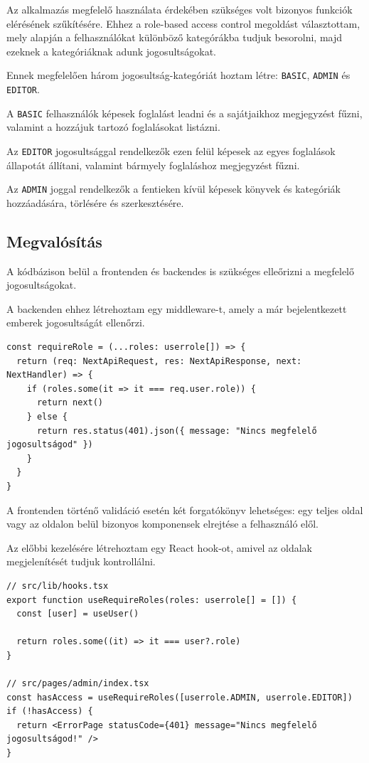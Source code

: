 Az alkalmazás megfelelő használata érdekében szükséges volt bizonyos funkciók elérésének szűkítésére. Ehhez a role-based access control
megoldást választottam, mely alapján a felhasználókat különböző kategórákba tudjuk besorolni, majd ezeknek a kategóriáknak adunk jogosultságokat.

Ennek megfelelően három jogosultság-kategóriát hoztam létre: \lstinline|BASIC|, \lstinline|ADMIN| és \lstinline|EDITOR|.

A \lstinline|BASIC| felhasználók képesek foglalást leadni és a sajátjaikhoz megjegyzést fűzni, valamint a hozzájuk tartozó foglalásokat listázni.

Az \lstinline|EDITOR| jogosultsággal rendelkezők ezen felül képesek az egyes foglalások állapotát állítani, valamint bármyely foglaláshoz
megjegyzést fűzni.

Az \lstinline|ADMIN| joggal rendelkezők a fentieken kívül képesek könyvek és kategóriák hozzáadására, törlésére és szerkesztésére.

\subsection{Megvalósítás}

A kódbázison belül a frontenden és backendes is szükséges elleőrizni a megfelelő jogosultságokat.

A backenden ehhez létrehoztam egy middleware-t, amely a már bejelentkezett emberek jogosultságát ellenőrzi.
\begin{lstlisting}[caption=Authorizáció middleware]
const requireRole = (...roles: userrole[]) => {
  return (req: NextApiRequest, res: NextApiResponse, next: NextHandler) => {
    if (roles.some(it => it === req.user.role)) {
      return next()
    } else {
      return res.status(401).json({ message: "Nincs megfelelő jogosultságod" })
    }
  }
}
\end{lstlisting}

A frontenden történő validáció esetén két forgatókönyv lehetséges: egy teljes oldal vagy az oldalon belül bizonyos komponensek
elrejtése a felhasználó elől.

Az előbbi kezelésére létrehoztam egy React hook-ot, amivel az oldalak megjelenítését tudjuk kontrollálni.

\begin{lstlisting}[caption=Authorizációs hook és használata]
// src/lib/hooks.tsx
export function useRequireRoles(roles: userrole[] = []) {
  const [user] = useUser()

  return roles.some((it) => it === user?.role)
}

// src/pages/admin/index.tsx
const hasAccess = useRequireRoles([userrole.ADMIN, userrole.EDITOR])
if (!hasAccess) {
  return <ErrorPage statusCode={401} message="Nincs megfelelő jogosultságod!" />
}
\end{lstlisting}

